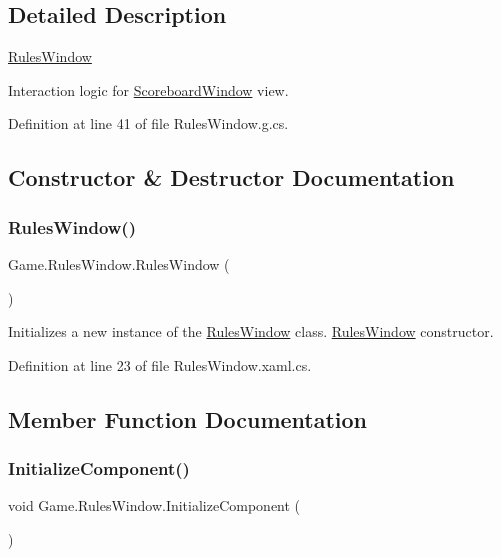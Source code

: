 \subsection{Detailed Description}
\mbox{\hyperlink{class_game_1_1_rules_window}{Rules\+Window}} 

Interaction logic for \mbox{\hyperlink{class_game_1_1_scoreboard_window}{Scoreboard\+Window}} view.

Definition at line 41 of file Rules\+Window.\+g.\+cs.



\subsection{Constructor \& Destructor Documentation}
\mbox{\label{class_game_1_1_rules_window_a39f6fce57d6796318fccc623a4ccfe4e}} 
\subsubsection{\texorpdfstring{RulesWindow()}{RulesWindow()}}
{\footnotesize\ttfamily Game.\+Rules\+Window.\+Rules\+Window (\begin{DoxyParamCaption}{ }\end{DoxyParamCaption})}



Initializes a new instance of the \mbox{\hyperlink{class_game_1_1_rules_window}{Rules\+Window}} class. \mbox{\hyperlink{class_game_1_1_rules_window}{Rules\+Window}} constructor. 



Definition at line 23 of file Rules\+Window.\+xaml.\+cs.



\subsection{Member Function Documentation}
\mbox{\label{class_game_1_1_rules_window_a1aec29ee1681cac885a5f65300b51e5f}} 
\subsubsection{\texorpdfstring{InitializeComponent()}{InitializeComponent()}\hspace{0.1cm}{\footnotesize\ttfamily [1/2]}}
{\footnotesize\ttfamily void Game.\+Rules\+Window.\+Initialize\+Component (\begin{DoxyParamCaption}{ }\end{DoxyParamCaption})}



